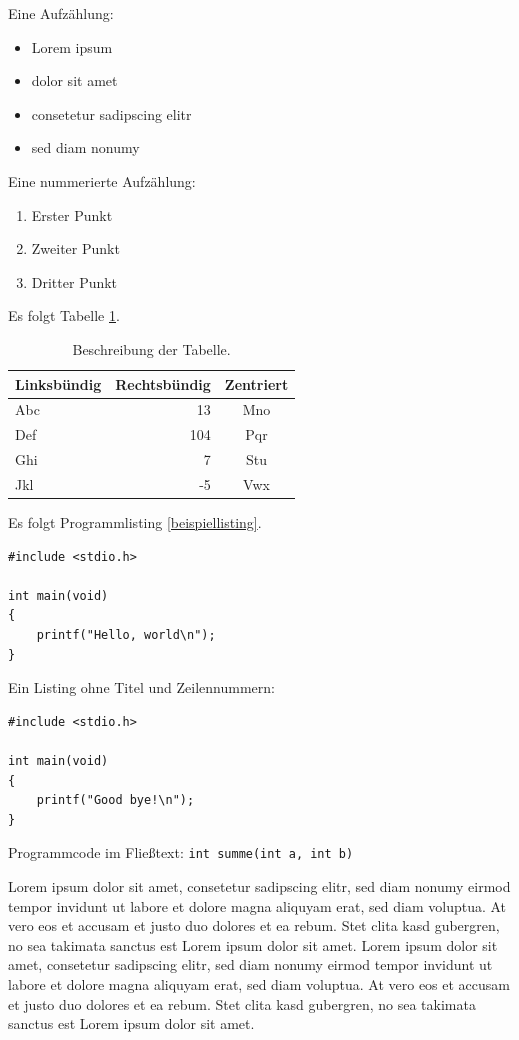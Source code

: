 Eine Aufzählung:

\begin{itemize}
\item Lorem ipsum
\item dolor sit amet
\item consetetur sadipscing elitr
\item sed diam nonumy
\end{itemize}

Eine nummerierte Aufzählung:

\begin{enumerate}
\item Erster Punkt
\item Zweiter Punkt
\item Dritter Punkt
\end{enumerate}

Es folgt Tabelle \ref{beispieltabelle}.

\begin{table}[htbp]
\centering
\begin{tabular}{lrc}
\toprule
Linksbündig & Rechtsbündig & Zentriert \\
\midrule
Abc &  13 & Mno \\ \addlinespace
Def & 104 & Pqr \\ \addlinespace
Ghi &   7 & Stu \\ \addlinespace
Jkl &  -5 & Vwx \\
\bottomrule
\end{tabular}
\caption{Beschreibung der Tabelle.}
\label{beispieltabelle}
\end{table}

Es folgt Programmlisting \ref{beispiellisting}.

\begin{lstlisting}[caption={Beschreibung des Listings.}, label=beispiellisting]
#include <stdio.h>

int main(void)
{
    printf("Hello, world\n");
}
\end{lstlisting}

Ein Listing ohne Titel und Zeilennummern:

\begin{lstlisting}[numbers=none]
#include <stdio.h>

int main(void)
{
    printf("Good bye!\n");
}
\end{lstlisting}

Programmcode im Fließtext: \lstinline{int summe(int a, int b)}

Lorem ipsum dolor sit amet, consetetur sadipscing elitr, sed diam nonumy eirmod tempor invidunt ut labore et dolore magna aliquyam erat, sed diam voluptua. At vero eos et accusam et justo duo dolores et ea rebum. Stet clita kasd gubergren, no sea takimata sanctus est Lorem ipsum dolor sit amet. Lorem ipsum dolor sit amet, consetetur sadipscing elitr, sed diam nonumy eirmod tempor invidunt ut labore et dolore magna aliquyam erat, sed diam voluptua. At vero eos et accusam et justo duo dolores et ea rebum. Stet clita kasd gubergren, no sea takimata sanctus est Lorem ipsum dolor sit amet.
